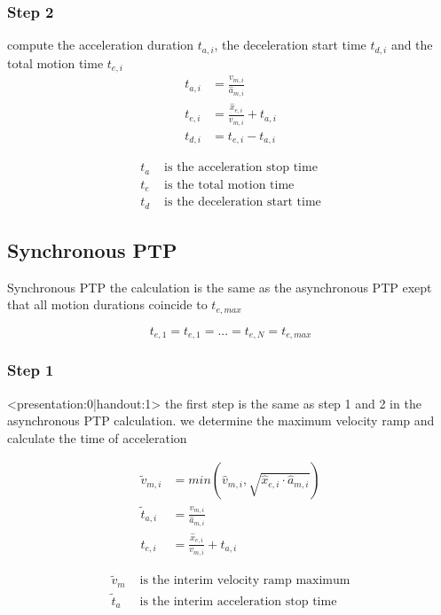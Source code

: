 \documentclass[%
  professionalfonts,%
  xcolor={%
    usenames,%
    dvipsnames,%
    svgnames,%
    table,%
    hyperref%
  }%
]{beamer}
\begin{document}
\subsubsection{Step 2}
\begin{frame}
compute the acceleration duration $t_{a,i}$, the deceleration start time $t_{d,i}$ and the total motion time $t_{e,i}$
\begin{align*}
t_{a,i} & = \frac{v_{m,i}}{\hat{a}_{m,i}} \\
t_{e,i} & = \frac{\hat{x}_{e,i}}{v_{m,i}} + t_{a,i} \\
t_{d,i} & = t_{e,i} - t_{a,i}
\end{align*}

\begin{align*}
t_{a} & \text{ is the acceleration stop time} \\
t_{e} & \text{ is the total motion time} \\
t_{d} & \text{ is the deceleration start time}
\end{align*}
\end{frame}
  
\subsection{Synchronous PTP}
\begin{frame}{Synchronous PTP}
the calculation is the same as the asynchronous PTP
exept that all motion durations coincide to $t_{e,max}$

\begin{equation*}
t_{e,1} = t_{e,1} = ... = t_{e,N} = t_{e,max}
\end{equation*}
\end{frame}

\subsubsection{Step 1}
\begin{frame}<presentation:0|handout:1>
the first step is the same as step 1 and 2 in the asynchronous PTP calculation. we determine the maximum velocity ramp and  calculate the time of acceleration
\end{frame}

\begin{frame}
\begin{align*}
\tilde{v}_{m,i} & = min(\hat{v}_{m,i},\sqrt{\hat{x}_{e,i} \cdot \hat{a}_{m,i}}) \\
\tilde{t}_{a,i} & = \frac{v_{m,i}}{\hat{a}_{m,i}}\\
t_{e,i} & = \frac{\hat{x}_{e,i}}{v_{m,i}} + t_{a,i}
\end{align*}

\begin{align*}
\tilde{v}_{m} & \text{ is the interim velocity ramp maximum}\\
\tilde{t}_{a} & \text{ is the interim acceleration stop time}\\
\end{align*}                 
\end{frame}
\end{document}
